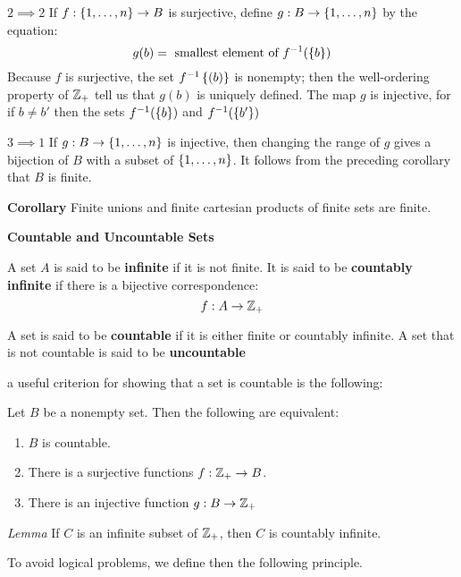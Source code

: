$ 2 \implies 2 $ If $f : \left\lbrace 1, \ldots, n \right\rbrace \rightarrow B$ is surjective, define $ g : B \rightarrow \left\lbrace 1, \ldots,n \right\rbrace $ by the equation:
\[ g(b) = \textrm{ smallest element of } f^{-1}(\left\lbrace b \right\rbrace) \]
Because $f$ is surjective, the set $ f^{-1}\left\lbrace (b) \right\rbrace $ is nonempty; then the well-ordering property of $ \mathbb{Z}_+ $ tell us that $ g(b) $ is uniquely defined. The map $g$ is injective, for if $ b \neq b'$ then the sets $ f^{-1}(\left\lbrace b \right\rbrace) $  and $ f^{-1}(\left\lbrace b' \right\rbrace) $

$ 3 \implies 1 $ If $ g : B \rightarrow \left\lbrace 1, \ldots, n \right\rbrace $ is injective, then changing the range of $g$ gives a bijection of $B$ with a subset of $ \left\lbrace 1, \ldots, n \right\rbrace $. It follows from the preceding corollary that $B$ is finite. \qedsymbol

\textbf{Corollary} Finite unions and finite cartesian products of finite sets are finite.


\textbf{\LARGE Countable and Uncountable Sets}

\begin{defn}
	A set $A$ is said to be \textbf{infinite} if it is not finite. It is said to be \textbf{countably infinite} if there is a bijective correspondence:
	\[ f : A \rightarrow \mathbb{Z}_+ \]
	
\end{defn}

\begin{defn}
	A set is said to be \textbf{countable} if it is either finite or countably infinite. A set that is not countable is said to be \textbf{uncountable}
\end{defn}

a useful criterion for showing that a set is countable is the following:

\begin{thm} \label{countable criterion}
	Let $B$ be a nonempty set. Then the following are equivalent:
	\begin{enumerate}
		\item $B$  is countable.
		\item There is a surjective functions $ f : \mathbb{Z}_+ \rightarrow B $.
		\item There is an injective function $ g : B \rightarrow \mathbb{Z}_+ $
	\end{enumerate}
\end{thm}

\textit{Lemma } If $C$ is an infinite subset of $ \mathbb{Z}_+ $, then $C$ is countably infinite.

To avoid logical problems, we define then the following principle.

